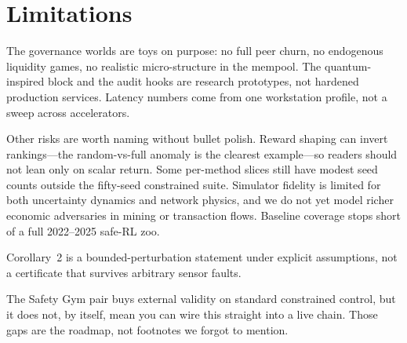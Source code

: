\section{Limitations}

The governance worlds are toys on purpose: no full peer churn, no endogenous liquidity games, no realistic micro-structure in the mempool. The quantum-inspired block and the audit hooks are research prototypes, not hardened production services. Latency numbers come from one workstation profile, not a sweep across accelerators.

Other risks are worth naming without bullet polish. Reward shaping can invert rankings---the random-vs-full anomaly is the clearest example---so readers should not lean only on scalar return. Some per-method slices still have modest seed counts outside the fifty-seed constrained suite. Simulator fidelity is limited for both uncertainty dynamics and network physics, and we do not yet model richer economic adversaries in mining or transaction flows. Baseline coverage stops short of a full 2022--2025 safe-RL zoo.

Corollary~2 is a bounded-perturbation statement under explicit assumptions, not a certificate that survives arbitrary sensor faults.

The Safety Gym pair buys external validity on standard constrained control, but it does not, by itself, mean you can wire this straight into a live chain. Those gaps are the roadmap, not footnotes we forgot to mention.

